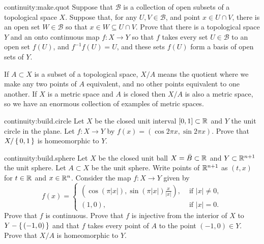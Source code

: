 \begin{problem}{continuity:make.quot}
Suppose that \(\mathcal{B}\) is a collection of open subsets of a topological space \(X\).
Suppose that, for any \(U,V\in\mathcal{B}\), and point \(x\in U\cap V\), there is an open set \(W\in\mathcal{B}\) so that \(x\in W\subseteq U\cap V\).
Prove that there is a topological space \(Y\) and an onto continuous map \(f\colon X \to Y\) so that \(f\) takes every set \(U\in\mathcal{B}\) to an open set \(f(U)\), and \(f^{-1}f(U)=U\), and these sets \(f(U)\) form a basis of open sets of \(Y\).
\end{problem}
If \(A \subset X\) is a subset of a topological space, \(X/A\) means the quotient where we make any two points of \(A\) equivalent, and no other points equivalent to one another.
If \(X\) is a metric space and \(A\) is closed then \(X/A\) is also a metric space, so we have an enormous collection of examples of metric spaces.
\begin{problem}{continuity:build.circle}
Let \(X\) be the closed unit interval \([0,1] \subset \mathbb{R}^{}\) and \(Y\) the unit circle in the plane.
Let \(f \colon X \to Y\) by \(f(x)=(\cos 2\pi x, \sin 2\pi x)\).
Prove that \(X/\set{0,1}\) is homeomorphic to \(Y\).
\end{problem}
\begin{problem*}{continuity:build.sphere}
Let \(X\) be the closed unit ball \(X=\bar{B} \subset \mathbb{R}^{}\) and \(Y \subset \mathbb{R}^{n+1}\) the unit sphere.
Let \(A \subset X\) be the unit sphere.
Write points of \(\mathbb{R}^{n+1}\) as \((t,x)\) for \(t \in \mathbb{R}^{}\) and \(x \in \mathbb{R}^{n}\).
Consider the map \(f \colon X \to Y\) given by
\[
f(x)=
\begin{cases}
\left(\cos(\pi |x|), \sin(\pi |x|)\frac{x}{|x|}\right), & \text{ if \(|x|\ne 0\)}, \\
(1,0), & \text{ if \(|x|=0\).}
\end{cases}
\]
Prove that \(f\) is continuous.
Prove that \(f\) is injective from the interior of \(X\) to \(Y-\set{(-1,0)}\) and that \(f\) takes every point of \(A\) to the point \((-1,0) \in Y\).
Prove that \(X/A\) is homeomorphic to \(Y\).
\end{problem*}
